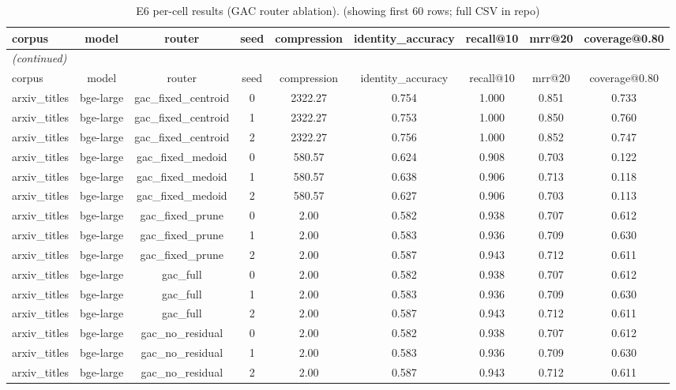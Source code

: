 \begin{longtable}{lcccccccc}
\caption{E6 per-cell results (GAC router ablation). (showing first 60 rows; full CSV in repo)}\label{tab:supp_e6}\\
\toprule
corpus & model & router & seed & compression & identity\_accuracy & recall@10 & mrr@20 & coverage@0.80 \\
\midrule
\endfirsthead
\multicolumn{9}{l}{\small\itshape (continued)}\\
\toprule
corpus & model & router & seed & compression & identity\_accuracy & recall@10 & mrr@20 & coverage@0.80 \\
\midrule
\endhead
\bottomrule
\endfoot
arxiv\_titles & bge-large & gac\_fixed\_centroid & 0 & 2322.27 & 0.754 & 1.000 & 0.851 & 0.733 \\
arxiv\_titles & bge-large & gac\_fixed\_centroid & 1 & 2322.27 & 0.753 & 1.000 & 0.850 & 0.760 \\
arxiv\_titles & bge-large & gac\_fixed\_centroid & 2 & 2322.27 & 0.756 & 1.000 & 0.852 & 0.747 \\
arxiv\_titles & bge-large & gac\_fixed\_medoid & 0 & 580.57 & 0.624 & 0.908 & 0.703 & 0.122 \\
arxiv\_titles & bge-large & gac\_fixed\_medoid & 1 & 580.57 & 0.638 & 0.906 & 0.713 & 0.118 \\
arxiv\_titles & bge-large & gac\_fixed\_medoid & 2 & 580.57 & 0.627 & 0.906 & 0.703 & 0.113 \\
arxiv\_titles & bge-large & gac\_fixed\_prune & 0 & 2.00 & 0.582 & 0.938 & 0.707 & 0.612 \\
arxiv\_titles & bge-large & gac\_fixed\_prune & 1 & 2.00 & 0.583 & 0.936 & 0.709 & 0.630 \\
arxiv\_titles & bge-large & gac\_fixed\_prune & 2 & 2.00 & 0.587 & 0.943 & 0.712 & 0.611 \\
arxiv\_titles & bge-large & gac\_full & 0 & 2.00 & 0.582 & 0.938 & 0.707 & 0.612 \\
arxiv\_titles & bge-large & gac\_full & 1 & 2.00 & 0.583 & 0.936 & 0.709 & 0.630 \\
arxiv\_titles & bge-large & gac\_full & 2 & 2.00 & 0.587 & 0.943 & 0.712 & 0.611 \\
arxiv\_titles & bge-large & gac\_no\_residual & 0 & 2.00 & 0.582 & 0.938 & 0.707 & 0.612 \\
arxiv\_titles & bge-large & gac\_no\_residual & 1 & 2.00 & 0.583 & 0.936 & 0.709 & 0.630 \\
arxiv\_titles & bge-large & gac\_no\_residual & 2 & 2.00 & 0.587 & 0.943 & 0.712 & 0.611 \\

\end{longtable}
